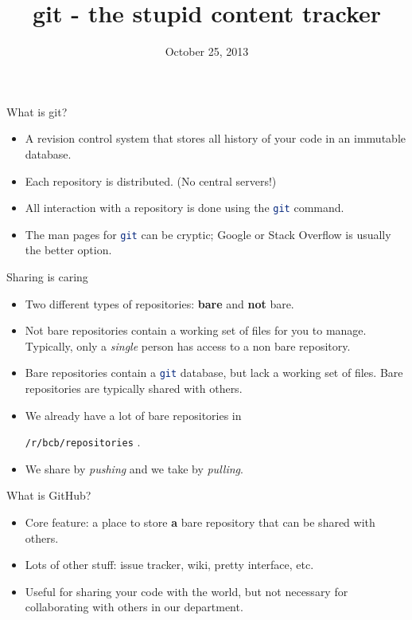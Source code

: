 \documentclass{beamer}
\title{git - the stupid content tracker}
\date{October 25, 2013}
\newenvironment{myitemize}{
  \begin{itemize}
  \setlength{\itemsep}{5pt}
}{\end{itemize}}
\newcommand{\code}[1]{
  \lstinline[language=bash,basicstyle=\ttfamily]{#1}
}
\begin{document}
\begin{frame}
\titlepage
\end{frame}

\begin{frame}[t,fragile]{What is git?}
\begin{myitemize}
  \item<1->
    A revision control system that stores all history of your code in an
    immutable database.
  \item<2->
    Each repository is distributed. (No central servers!)
  \item<3->
    All interaction with a repository is done using the \code{git} command.
  \item<4->
    The man pages for \code{git} can be cryptic; Google or Stack Overflow is 
    usually the better option.
\end{myitemize}
\end{frame}

\begin{frame}[t,fragile]{Sharing is caring}
\begin{myitemize}
  \item<1->
    Two different types of repositories: \textbf{bare} and \textbf{not} bare.
  \item<2->
    Not bare repositories contain a working set of files for you to manage.
    Typically, only a \emph{single} person has access to a non bare repository.
  \item<3->
    Bare repositories contain a \code{git} database, but lack a working set
    of files.
    Bare repositories are typically shared with others.
  \item<4->
    We already have a lot of bare repositories in
    \code{/r/bcb/repositories}.
  \item<5->
    We share by \emph{pushing} and we take by \emph{pulling}.
\end{myitemize}
\end{frame}

\begin{frame}[t,fragile]{What is GitHub?}
\begin{myitemize}
  \item<1->
    Core feature: a place to store \textbf{a} bare repository that can be 
    shared with others.
  \item<2->
    Lots of other stuff: issue tracker, wiki, pretty interface, etc.
  \item<3->
    Useful for sharing your code with the world, but not necessary for
    collaborating with others in our department.
\end{myitemize}
\end{frame}
\end{document}
